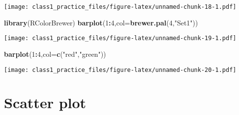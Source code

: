 \documentclass[
]{article}
\newenvironment{Shaded}{\begin{snugshade}}{\end{snugshade}}
\newcommand{\AttributeTok}[1]{\textcolor[rgb]{0.13,0.29,0.53}{#1}}
\newcommand{\DecValTok}[1]{\textcolor[rgb]{0.00,0.00,0.81}{#1}}
\newcommand{\FloatTok}[1]{\textcolor[rgb]{0.00,0.00,0.81}{#1}}
\newcommand{\FunctionTok}[1]{\textcolor[rgb]{0.13,0.29,0.53}{\textbf{#1}}}
\newcommand{\NormalTok}[1]{#1}
\newcommand{\OtherTok}[1]{\textcolor[rgb]{0.56,0.35,0.01}{#1}}
\newcommand{\SpecialCharTok}[1]{\textcolor[rgb]{0.81,0.36,0.00}{\textbf{#1}}}
\newcommand{\StringTok}[1]{\textcolor[rgb]{0.31,0.60,0.02}{#1}}
\begin{document}
\texttt{[image: class1\_practice\_files/figure-latex/unnamed-chunk-18-1.pdf]}

\begin{Shaded}
\begin{Highlighting}[]
\FunctionTok{library}\NormalTok{(RColorBrewer)}
\FunctionTok{barplot}\NormalTok{(}\DecValTok{1}\SpecialCharTok{:}\DecValTok{4}\NormalTok{,}\AttributeTok{col=}\FunctionTok{brewer.pal}\NormalTok{(}\DecValTok{4}\NormalTok{,}\StringTok{"Set1"}\NormalTok{))}
\end{Highlighting}
\end{Shaded}

\texttt{[image: class1\_practice\_files/figure-latex/unnamed-chunk-19-1.pdf]}

\begin{Shaded}
\begin{Highlighting}[]
\FunctionTok{barplot}\NormalTok{(}\DecValTok{1}\SpecialCharTok{:}\DecValTok{4}\NormalTok{,}\AttributeTok{col=}\FunctionTok{c}\NormalTok{(}\StringTok{"red"}\NormalTok{,}\StringTok{"green"}\NormalTok{))}
\end{Highlighting}
\end{Shaded}

\texttt{[image: class1\_practice\_files/figure-latex/unnamed-chunk-20-1.pdf]}

\hypertarget{scatter-plot}{%
\section{Scatter plot}\label{scatter-plot}}

\begin{Shaded}
\end{Shaded}
\end{document}

